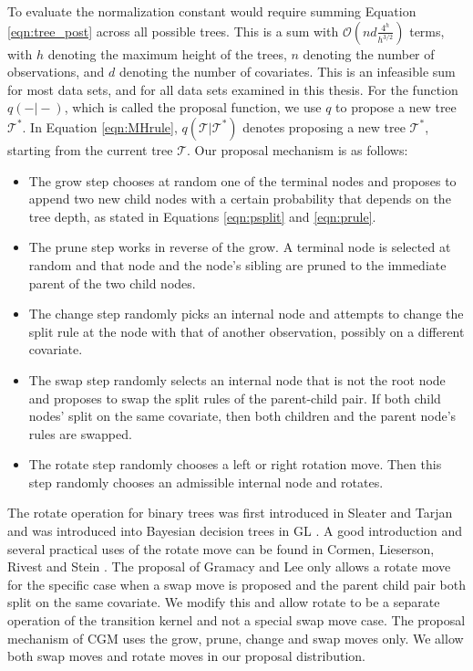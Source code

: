 \documentclass{article}
\begin{document}
To evaluate the normalization constant would require summing Equation \ref{eqn:tree_post} across all possible trees. This is a sum with $\mathcal{O}(nd\frac{4^h}{h^{3/2}})$ terms, with $h$ denoting the maximum height of the trees, $n$ denoting the number of observations, and $d$ denoting the number of covariates. This is an infeasible sum for most data sets, and for all data sets examined in this thesis. For the function $q(-\vert-)$, which is called the proposal function, we use $q$ to propose a new tree $\mathcal{T}^*$.   
In Equation \ref{eqn:MHrule}, $q(\mathcal{T}\vert\mathcal{T}^*)$ denotes proposing a new tree $\mathcal{T}^*$, starting from the current tree $\mathcal{T}$. 
 Our proposal mechanism is as follows:
  \begin{itemize}
 \item The grow step chooses at random one of the terminal nodes and proposes to append two new child nodes with a certain probability that depends on the tree depth, as stated in Equations \ref{eqn:psplit} and \ref{eqn:prule}.
 \item The prune step works in reverse of the grow. A terminal node is selected at random and that node and the node's sibling are pruned to the immediate parent of the two child nodes.
 \item The change step randomly picks an internal node and attempts to change the split rule at the node with that of another observation, possibly on a different covariate.
  \item The swap step randomly selects an internal node that is not the root node and proposes to swap the split rules of the parent-child pair. If both child nodes' split on the same covariate, then both children and the parent node's rules are swapped.
  \item The rotate step randomly chooses a left or right rotation move. Then this step randomly chooses an admissible internal node and rotates.
 \end{itemize}
  The rotate operation for binary trees was first introduced in Sleater and Tarjan \cite{sleator1985self} and was introduced into Bayesian decision trees in GL \cite{gramacy2008bayesian}. A good introduction and several practical uses of the rotate move can be found in Cormen, Lieserson, Rivest and Stein \cite{cormen2001introduction}. The proposal of Gramacy and Lee \cite{gramacy2008bayesian} only allows a rotate move for the specific case when a swap move is proposed and the parent child pair both split on the same covariate. We modify this and allow rotate to be a separate operation of the transition kernel and not a special swap move case. The proposal mechanism of CGM uses the grow, prune, change and swap moves only. We allow both swap moves and rotate moves in our proposal distribution.  
  
\end{document}
